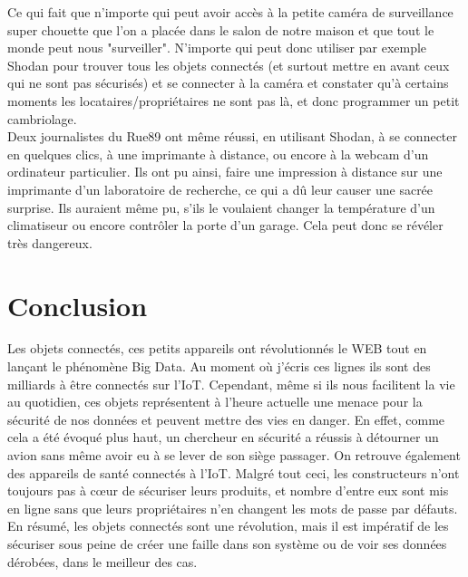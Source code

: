 \documentclass[a4paper]{report}
\begin{document}
	Ce qui fait que n'importe qui peut avoir accès à la petite caméra de surveillance super chouette que l'on a placée dans le salon de notre maison et que tout le monde peut nous "surveiller". N'importe qui peut donc utiliser par exemple Shodan pour trouver tous les objets connectés (et surtout mettre en avant ceux qui ne sont pas sécurisés) et se connecter à la caméra et constater qu'à certains moments les locataires/propriétaires ne sont pas là, et donc programmer un petit cambriolage.\\ 

	Deux journalistes du Rue89 ont même réussi, en utilisant Shodan, à se connecter en quelques clics, à une imprimante à distance, ou encore à la webcam d'un ordinateur particulier. Ils ont pu ainsi, faire une impression à distance sur une imprimante d'un laboratoire de recherche, ce qui a dû leur causer une sacrée surprise.
	Ils auraient même pu, s'ils le voulaient changer la température d'un climatiseur ou encore contrôler la porte d'un garage. Cela peut donc se révéler très dangereux. 	
	
	
	\section{Conclusion}
	
	Les objets connectés, ces petits appareils ont révolutionnés le WEB tout en lançant le phénomène Big Data. Au moment où j'écris ces
	lignes ils sont des milliards à être connectés sur l'IoT. Cependant, même si ils nous facilitent la vie au quotidien, ces objets
	représentent à l'heure actuelle une menace pour la sécurité de nos données et peuvent mettre des vies en danger. En effet, comme cela
	a été évoqué plus haut, un chercheur en sécurité a réussis à détourner un avion sans même avoir eu à se lever de son siège passager. On
	retrouve également des appareils de santé connectés à l'IoT. Malgré tout ceci, les constructeurs n'ont toujours pas à cœur de sécuriser
	leurs produits, et nombre d'entre eux sont mis en ligne sans que leurs propriétaires n'en changent les mots de passe par défauts.\\
	En résumé, les objets connectés sont une révolution, mais il est impératif de les sécuriser sous peine de créer une faille dans son système
	ou de voir ses données dérobées, dans le meilleur des cas.
	
	\newpage
\end{document}
